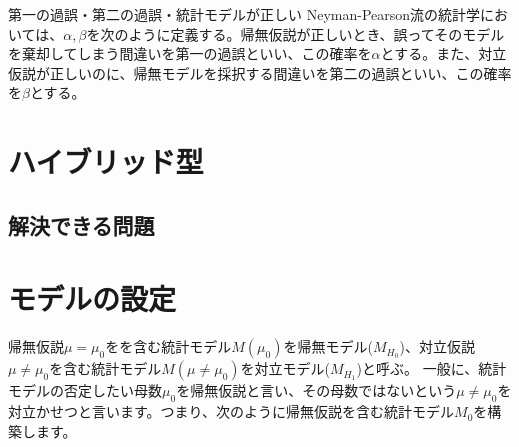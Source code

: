 \begin{SMbox}{第一の過誤・第二の過誤・統計モデルが正しい}
    Neyman-Pearson流の統計学においては、$\alpha,\beta$を次のように定義する。帰無仮説が正しいとき、誤ってそのモデルを棄却してしまう間違いを第一の過誤といい、この確率を$\alpha$とする。また、対立仮説が正しいのに、帰無モデルを採択する間違いを第二の過誤といい、この確率を$\beta$とする。



\end{SMbox}


\section{ハイブリッド型}
\subsection{解決できる問題}



\section{モデルの設定}
帰無仮説$\mu=\mu_0$をを含む統計モデル$M(\mu_0)$を帰無モデル($M_{H_0}$)、対立仮説$\mu\neq \mu_0$を含む統計モデル$M(\mu\neq\mu_0)$を対立モデル($M_{H_1}$)と呼ぶ。
一般に、統計モデルの否定したい母数$\mu_0$を帰無仮説と言い、その母数ではないという$\mu\neq\mu_0$を対立かせつと言います。つまり、次のように帰無仮説を含む統計モデル$M_0$を構築します。

